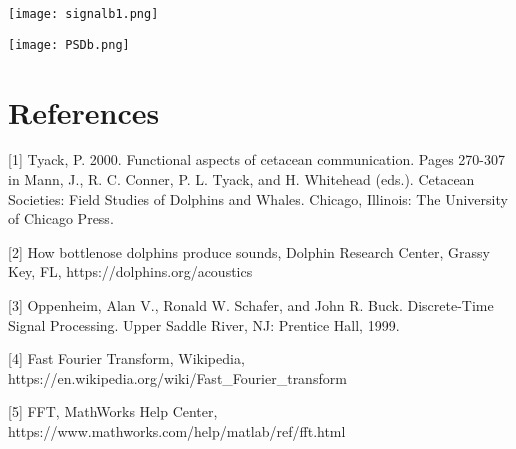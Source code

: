 \documentclass[11pt,a4paper]{article}
\begin{document}
\begin{flushleft}
\begin{flushleft}
\begin{flushleft}
\bigskip \texttt{[image: signalb1.png]}

\texttt{[image: PSDb.png]}

\bigskip 

\vspace{7cm}
\section{References}
\hspace{0.3cm}[1] Tyack, P. 2000. Functional aspects of cetacean communication. Pages 270-307 in Mann, J., R. C. Conner, P. L. Tyack, and H. Whitehead (eds.). Cetacean Societies: Field Studies of Dolphins and Whales. Chicago, Illinois: The University of Chicago Press.

\medskip \hspace{0.2cm} [2] How bottlenose dolphins produce sounds, Dolphin Research Center, Grassy Key, FL, https://dolphins.org/acoustics

\medskip \hspace{0.2cm} [3] Oppenheim, Alan V., Ronald W. Schafer, and John R. Buck. Discrete-Time Signal Processing. Upper Saddle River, NJ: Prentice Hall, 1999.

\medskip \hspace{0.2cm} [4]  Fast Fourier Transform, Wikipedia, https://en.wikipedia.org/wiki/Fast{\_}Fourier{\_}transform

\medskip \hspace{0.2cm} [5] FFT, MathWorks Help Center, https://www.mathworks.com/help/matlab/ref/fft.html

\begin{comment}

This will produce \textsc{small caps} text.\\

This will produce \textbf{bold and big} text.\\

This will produce \begin{huge} really huge \end{huge} text.\\

This will generate \begin{tiny} quite small \end{tiny} print.\\


\end{comment}
\end{flushleft}
\end{flushleft}
\end{flushleft}
\end{document}

